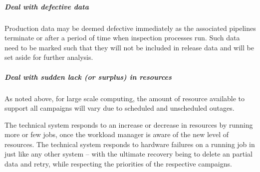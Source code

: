 \subparagraph{Deal with defective data}
Production data may be deemed defective immediately as the associated pipelines 
terminate or after a period of time when inspection processes run. Such data need 
to be marked such that they will not be included in release data and will be set aside 
for further analysis.

\subparagraph{Deal with sudden lack (or surplus) in resources}
As noted above, for large scale computing, the amount of resource available to 
support all campaigns will vary due to scheduled and unscheduled outages.  

The technical system responds to an increase or decrease in resources by running 
more or few jobs, once the workload manager is aware of the new level of 
resources. The technical system responds to hardware failures on a running job 
in just like any other system -- with the ultimate recovery being to  delete an 
partial data and retry, while respecting the priorities of the respective campaigns. 
